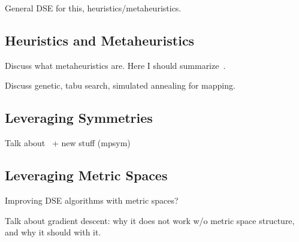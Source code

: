 General DSE for this, heuristics/metaheuristics.

\subsection{Heuristics and Metaheuristics}

Discuss what metaheuristics are.
Here I should summarize~\cite{goens_mcsoc16}.

Discuss genetic, tabu search, simulated annealing for mapping.

\subsection{Leveraging Symmetries}
Talk about~\cite{goens_taco17} + new stuff (mpsym)

\subsection{Leveraging Metric Spaces}
Improving DSE algorithms with metric spaces?

Talk about gradient descent: why it does not work w/o metric space structure, and why it should with it.
